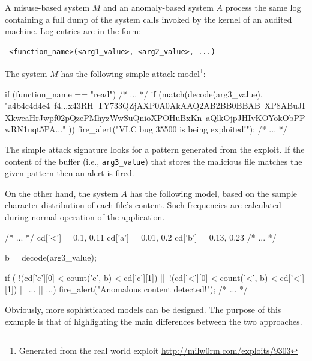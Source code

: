 \begin{example}\label{ex:misuse-vs-anomaly}
  A misuse-based system $M$ and an anomaly-based system $A$ process
  the same log containing a full dump of the system calls invoked by
  the kernel of an audited machine. Log entries are in the form:

  \begin{center}\small
    \begin{verbatim} <function_name>(<arg1_value>, <arg2_value>, ...)
    \end{verbatim}
  \end{center}

\noindent The system $M$ has the following simple attack
model\footnote{Generated from the real world exploit
\url{http://milw0rm.com/exploits/9303}}:

\begin{pseudoc}
  if (function_name == "read") {
    /* ... */ if (match(decode(arg3_value), "a{4}b{4}c{4}d{4}e{4}\
        f{4}...x{4}3RH~TY7{33}QZjAXP0A0AkAAQ2AB2BB0BBAB\
        XP8ABuJIXkweaHrJwpf02pQzePMhyzWwSuQnioXPOHuBxKn\
        aQlkOjpJHIvKOYokObPPwRN1uqt5PA..." ))
    fire_alert("VLC bug 35500 is being exploited!"); /* ... */
  }
\end{pseudoc}
\end{example}

The simple attack signature looks for a pattern generated from the
exploit. If the content of the buffer (i.e., \texttt{arg3\_value})
that stores the malicious file matches the given pattern then an alert
is fired.

\noindent On the other hand, the system $A$ has the following model,
based on the sample character distribution of each file's
content. Such frequencies are calculated during normal operation of
the application.

\begin{pseudoc}
  /* ... */ cd['<'] = {0.1, 0.11} cd['a'] = {0.01, 0.2} cd['b'] =
  {0.13, 0.23} /* ... */

  b = decode(arg3_value);
  
  if ( !(cd['c'][0] < count('c', b) < cd['c'][1]) ||\
       !(cd['<'][0] < count('<', b) < cd['<'][1]) ||\
       ... || ...)  fire_alert("Anomalous content detected!");
  /* ... */
\end{pseudoc}

Obviously, more sophisticated models can be designed. The purpose of
this example is that of highlighting the main differences between the
two approaches.

